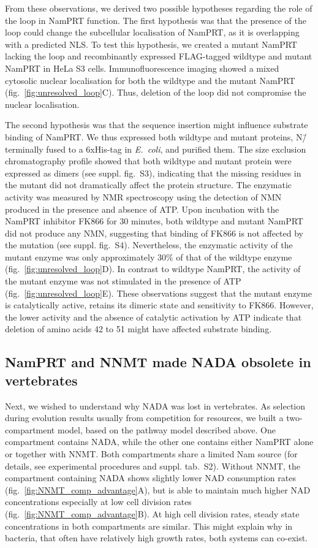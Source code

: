 From these observations, we derived two possible hypotheses regarding the role of the loop in NamPRT function. The first hypothesis was that the presence of the loop could change the subcellular localisation of NamPRT, as it is overlapping with a predicted NLS. To test this hypothesis, we created a mutant NamPRT lacking the loop and recombinantly expressed FLAG-tagged wildtype and mutant NamPRT in HeLa S3 cells. Immunofluorescence imaging showed a mixed cytosolic nuclear localisation for both the wildtype and the mutant NamPRT (fig.~\ref{fig:unresolved_loop}C). Thus, deletion of the loop did not compromise the nuclear localisation.

The second hypothesis was that the sequence insertion might influence substrate binding of NamPRT. We thus expressed both wildtype and mutant proteins, N\=/terminally fused to a 6xHis-tag in \textit{E.~coli}, and purified them. The size exclusion chromatography profile showed that both wildtype and mutant protein were expressed as dimers (see suppl. fig.~S3), indicating that the missing residues in the mutant did not dramatically affect the protein structure. The enzymatic activity was measured by NMR spectroscopy using the detection of NMN produced in the presence and absence of ATP. Upon incubation with the NamPRT inhibitor FK866 \citep{Hasmann2003} for 30 minutes, both wildtype and mutant NamPRT did not produce any NMN, suggesting that binding of FK866 is not affected by the mutation (see suppl. fig.~S4). Nevertheless, the enzymatic activity of the mutant enzyme was only approximately 30\% of that of the wildtype enzyme (fig.~\ref{fig:unresolved_loop}D). In contrast to wildtype NamPRT, the activity of the mutant enzyme was not stimulated in the presence of ATP (fig.~\ref{fig:unresolved_loop}E). These observations suggest that the mutant enzyme is catalytically active, retains its dimeric state and sensitivity to FK866. However, the lower activity and the absence of catalytic activation by ATP indicate that deletion of amino acids 42 to 51 might have affected substrate binding.


\subsection{NamPRT and NNMT made NADA obsolete in vertebrates}

Next, we wished to understand why NADA was lost in vertebrates. As selection during evolution results usually from competition for resources, we built a two-compartment model, based on the pathway model described above. One compartment contains NADA, while the other one contains either NamPRT alone or together with NNMT. Both compartments share a limited Nam source (for details, see experimental procedures and suppl. tab.~S2). Without NNMT, the compartment containing NADA shows slightly lower NAD consumption rates (fig.~\ref{fig:NNMT_comp_advantage}A), but is able to maintain much higher NAD concentrations especially at low cell division rates (fig.~\ref{fig:NNMT_comp_advantage}B). At high cell division rates, steady state concentrations in both compartments are similar. This might explain why in bacteria, that often have relatively high growth rates, both systems can co-exist.

